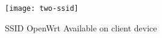 %	
%	
%	
%	
%	
%	
%	
%
%	
  \begin{figure}
	\centering
	\texttt{[image: two-ssid]}
	\caption {SSID OpenWrt Available on client device}
	\label{fig:two-ssid}
	\vspace{-10pt}
\end{figure}
